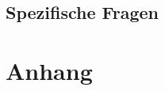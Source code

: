 \documentclass[a4paper,10pt]{article}
\begin{document}
\subsection{Spezifische Fragen}

\section{Anhang}
\end{document}
